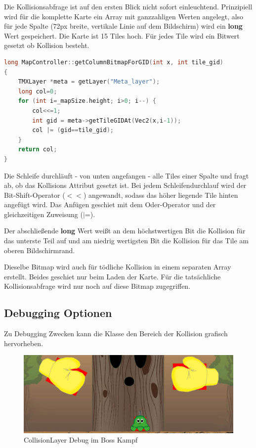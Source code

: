 Die Kollisionsabfrage ist auf den ersten Blick nicht sofort einleuchtend. Prinzipiell wird für die komplette Karte ein Array mit ganzzahligen Werten angelegt, also für jede Spalte (72px breite, vertikale Linie auf dem Bildschirm) wird ein \textbf{long} Wert gespeichert.
Die Karte ist 15 Tiles hoch. Für jedes Tile wird ein Bitwert gesetzt ob Kollision besteht.

\begin{lstlisting}[label=lst:collision_detection,
				   language=C++,
				   firstnumber=271,
				   caption=Collision Column abfragen ( MapController.cpp )]
long MapController::getColumnBitmapForGID(int x, int tile_gid)
{
	TMXLayer *meta = getLayer("Meta_layer");
	long col=0;
	for (int i=_mapSize.height; i>0; i--) {
		col<<=1;
		int gid = meta->getTileGIDAt(Vec2(x,i-1));
		col |= (gid==tile_gid);
	}
	return col;
}
\end{lstlisting}

Die Schleife durchläuft - von unten angefangen - alle Tiles einer Spalte und fragt ab, ob das Kollisions Attribut gesetzt ist. Bei jedem Schleifendurchlauf wird der Bit-Shift-Operator ($<<$) angewandt, sodass das höher liegende Tile hinten angefügt wird. Das Anfügen geschiet mit dem Oder-Operator und der gleichzeitigen Zuweisung ($|$=).

Der abschließende \textbf{long} Wert weißt an dem höchstwertigen Bit die Kollision für das unterste Teil auf und am niedrig wertigsten Bit die Kollision für das Tile am oberen Bildschirmrand.

Dieselbe Bitmap wird auch für tödliche Kollision in einem separaten Array erstellt. Beides geschiet nur beim Laden der Karte. Für die tatsächliche Kollisionsabfrage wird nur noch auf diese Bitmap zugegriffen.



\label{sec:4_CollisionLayer}
\subsection{Debugging Optionen}\label{sec:CollisionLayerDebug}

Zu Debugging Zwecken kann die  Klasse den Bereich der Kollision grafisch hervorheben.

\begin{figure}[H]
  \centering
  \includegraphics[width=\textwidth - 50pt]{resources/CollisionLayer_BossKampf.jpg}
  \caption{CollisionLayer Debug im Boss Kampf}
  \label{fig:collision_debug_boss} 
\end{figure}

